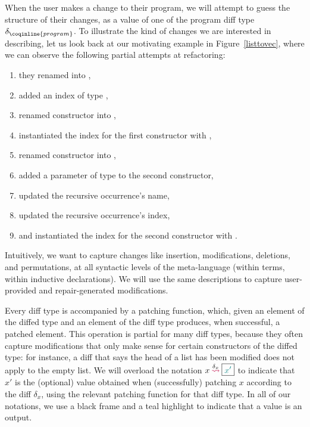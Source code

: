 When the user makes a change to their program, we will attempt to guess the
structure of their changes, as a value of one of the program diff type
$\delta_{\coqinline{program}}$.  To illustrate the kind of changes we are
interested in describing, let us look back at our motivating example in
Figure~\ref{listtovec}, where we can observe the following partial attempts at
refactoring:

\begin{enumerate}

\item they renamed  into ,

\item added an index of type ,

\item renamed constructor  into ,

\item instantiated the index for the first constructor with ,

\item renamed constructor  into ,

\item added a parameter  of type  to the second
  constructor,

\item updated the recursive occurrence's name,

\item updated the recursive occurrence's index,

\item and instantiated the index for the second constructor with .

\end{enumerate}

Intuitively, we want to capture changes like insertion, modifications,
deletions, and permutations, at all syntactic levels of the meta-language
(within terms, within inductive declarations).  We will use the same
descriptions to capture user-provided and repair-generated modifications.

Every diff type is accompanied by a patching function, which, given an element
of the diffed type and an element of the diff type produces, when successful, a
patched element.  This operation is partial for many diff types, because they
often capture modifications that only make sense for certain constructors of the
diffed type: for instance, a diff that says the head of a list has been modified
does not apply to the empty list.  We will overload the notation
$x \overset{\delta_x}{\mathbin{\textcolor{purple}{\rightsquigarrow}}} \boxed{ \textcolor{teal}{x'} }$ to indicate that $x'$ is the (optional) value
obtained when (successfully) patching $x$ according to the diff $\delta_x$,
using the relevant patching function for that diff type.  In all of our
notations, we use a black frame and a teal highlight to indicate that a value is
an output.

